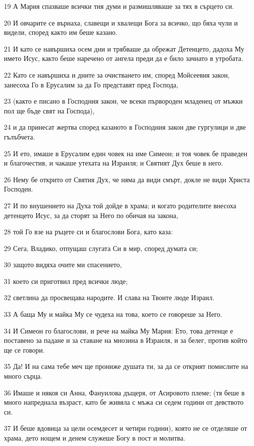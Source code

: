 \par 19 А Мария спазваше всички тия думи и размишляваше за тях в сърцето си.
\par 20 И овчарите се върнаха, славещи и хвалещи Бога за всичко, що бяха чули и видели, според както им беше казано.
\par 21 И като се навършиха осем дни и трябваше да обрежат Детенцето, дадоха Му името Исус, както беше наречено от ангела преди да е било зачнато в утробата.
\par 22 Като се навършиха и дните за очистването им, според Мойсеевия закон, занесоха Го в Ерусалим за да Го представят пред Господа,
\par 23 (както е писано в Господния закон, че всеки първороден младенец от мъжки пол ще бъде свят на Господа),
\par 24 и да принесат жертва според казаното в Господния закон две гургулици и две гълъбчета.
\par 25 И ето, имаше в Ерусалим един човек на име Симеон; и тоя човек бе праведен и благочестив, и чакаше утехата на Израиля; и Святият Дух беше в него.
\par 26 Нему бе открито от Святия Дух, че няма да види смърт, докле не види Христа Господен.
\par 27 И по внушението на Духа той дойде в храма; и когато родителите внесоха детенцето Исус, за да сторят за Него по обичая на закона,
\par 28 той Го взе на ръцете си и благослови Бога, като каза:
\par 29 Сега, Владико, отпущаш слугата Си в мир, според думата си;
\par 30 защото видяха очите ми спасението,
\par 31 което си приготвил пред всички люде;
\par 32 светлина да просвещава народите. И слава на Твоите люде Израил.
\par 33 А баща Му и майка Му се чудеха на това, което се говореше за Него.
\par 34 И Симеон го благослови, и рече на майка Му Мария: Ето, това детенце е поставено за падане и за ставане на мнозина в Израиля, и за белег, против който ще се говори.
\par 35 Да! И на сама тебе меч ще прониже душата ти, за да се открият помислите на много сърца.
\par 36 Имаше и някоя си Анна, Фануилова дъщеря, от Асировото племе; (тя беше в много напреднала възраст, като бе живяла с мъжа си седем години от девството си.
\par 37 И беше вдовица за цели осемдесет и четири години), която не се отделяше от храма, дето нощем и денем служеше Богу в пост и молитва.
